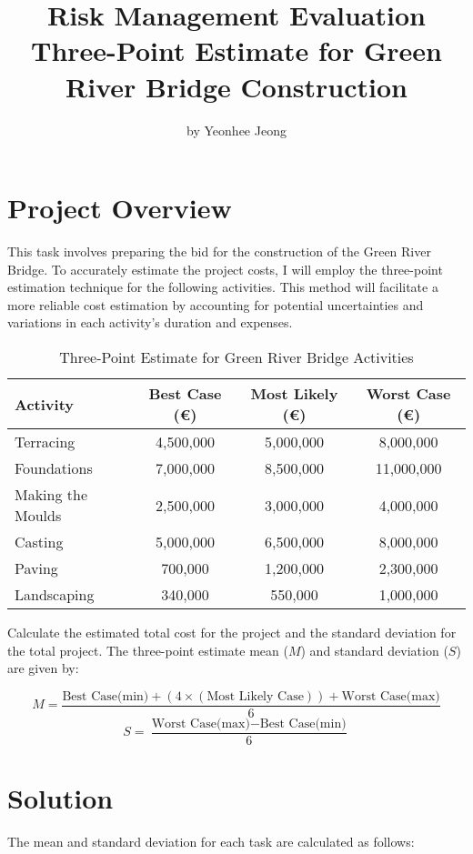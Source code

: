 \documentclass{article}
\title{ Risk Management Evaluation\\ Three-Point Estimate for Green River Bridge Construction}
\author{by Yeonhee Jeong}
\date{}
\begin{document}
\maketitle
\section*{Project Overview}

This task involves preparing the bid for the construction of the Green River Bridge. To accurately estimate the project costs, I will employ the three-point estimation technique for the following activities. This method will facilitate a more reliable cost estimation by accounting for potential uncertainties and variations in each activity's duration and expenses.


\begin{table}[h!]
\centering
\begin{tabular}{lccc}
\toprule
\textbf{Activity} & \textbf{Best Case (€)} & \textbf{Most Likely (€)} & \textbf{Worst Case (€)} \\
\midrule
Terracing         & 4,500,000  & 5,000,000  & 8,000,000  \\
Foundations       & 7,000,000  & 8,500,000  & 11,000,000 \\
Making the Moulds & 2,500,000  & 3,000,000  & 4,000,000  \\
Casting           & 5,000,000  & 6,500,000  & 8,000,000  \\
Paving            & 700,000    & 1,200,000  & 2,300,000  \\
Landscaping       & 340,000    & 550,000    & 1,000,000  \\
\bottomrule
\end{tabular}
\caption{Three-Point Estimate for Green River Bridge Activities}
\end{table}

\noindent Calculate the estimated total cost for the project and the standard deviation for the total project. The three-point estimate mean (\(M\)) and standard deviation (\(S\)) are given by:

\[
M = \frac{\text{Best Case(min)} + (4 \times(\text{Most Likely Case}))  + \text{Worst Case(max)}}{6}
\]
\[
S = \frac{\text{Worst Case(max)} - \text{Best Case(min)}}{6}
\]

\section*{Solution}

The mean and standard deviation for each task are calculated as follows:
\end{document}
